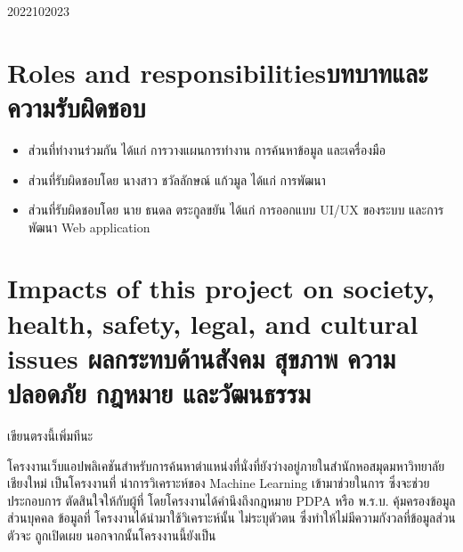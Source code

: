 \begin{plan}{11}{2022}{10}{2023}
\end{plan}

\section{\ifenglish Roles and responsibilities\else บทบาทและความรับผิดชอบ\fi}
\begin{itemize}
\item ส่วนที่ทำงานร่วมกัน ได้แก่ การวางแผนการทำงาน การค้นหาข้อมูล และเครื่องมือ
\item ส่วนที่รับผิดชอบโดย นางสาว ชวัลลักษณ์ แก้วมูล ได้แก่ การพัฒนา
\item ส่วนที่รับผิดชอบโดย นาย ธนดล ตระกูลขยัน ได้แก่ การออกแบบ UI/UX ของระบบ และการพัฒนา Web application
\end{itemize}
\section{\ifenglish%
Impacts of this project on society, health, safety, legal, and cultural issues
\else%
ผลกระทบด้านสังคม สุขภาพ ความปลอดภัย กฎหมาย และวัฒนธรรม
\fi}
เขียนตรงนี้เพิ่มทีนะ

โครงงานเว็บแอปพลิเคชันสำหรับการค้นหาตำแหน่งที่นั่งที่ยังว่างอยู่ภายในสำนักหอสมุดมหาวิทยาลัยเชียงใหม่ เป็นโครงงานที่
นำการวิเคราะห์ของ Machine Learning เข้ามาช่วยในการ   ซึ่งจะช่วยประกอบการ
ตัดสินใจให้กับผู้ที่ โดยโครงงานได้คำนึงถึงกฎหมาย PDPA หรือ พ.ร.บ. คุ้มครองข้อมูลส่วนบุคคล ข้อมูลที่
โครงงานได้นำมาใช้วิเคราะห์นั้น 
ไม่ระบุตัวตน ซึ่งทำให้ไม่มีความกังวลที่ข้อมูลส่วนตัวจะ
ถูกเปิดเผย นอกจากนั้นโครงงานนี้ยังเป็น
